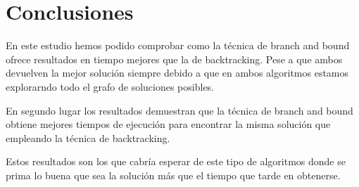 \documentclass{article}
\begin{document}
\section{Conclusiones}

En este estudio hemos podido comprobar como la técnica de branch and
bound ofrece resultados en tiempo mejores que la de backtracking. Pese
a que ambos devuelven la mejor solución siempre debido a que en ambos
algoritmos estamos explorarndo todo el grafo de soluciones posibles.

En segundo lugar los resultados demuestran que la técnica de branch
and bound obtiene mejores tiempos de ejecución para encontrar la misma
solución que empleando la técnica de backtracking.

Estos resultados son los que cabría esperar de este tipo de algoritmos
donde se prima lo buena que sea la solución más que el tiempo que
tarde en obtenerse.
\end{document}
